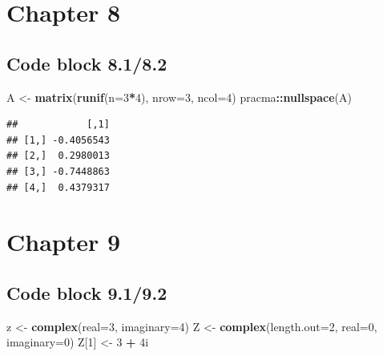 \documentclass[
]{book}
\newenvironment{Shaded}{\begin{snugshade}}{\end{snugshade}}
\newcommand{\DataTypeTok}[1]{\textcolor[rgb]{0.13,0.29,0.53}{#1}}
\newcommand{\DecValTok}[1]{\textcolor[rgb]{0.00,0.00,0.81}{#1}}
\newcommand{\KeywordTok}[1]{\textcolor[rgb]{0.13,0.29,0.53}{\textbf{#1}}}
\newcommand{\NormalTok}[1]{#1}
\newcommand{\OperatorTok}[1]{\textcolor[rgb]{0.81,0.36,0.00}{\textbf{#1}}}
\newcommand{\StringTok}[1]{\textcolor[rgb]{0.31,0.60,0.02}{#1}}
\begin{document}
\hypertarget{chapter-8}{%
\section*{Chapter 8}\label{chapter-8}}

\hypertarget{code-block-8.18.2}{%
\subsection*{Code block 8.1/8.2}\label{code-block-8.18.2}}

\begin{Shaded}
\begin{Highlighting}[]
\NormalTok{A \textless{}{-}}\StringTok{ }\KeywordTok{matrix}\NormalTok{(}\KeywordTok{runif}\NormalTok{(}\DataTypeTok{n=}\DecValTok{3}\OperatorTok{*}\DecValTok{4}\NormalTok{), }\DataTypeTok{nrow=}\DecValTok{3}\NormalTok{, }\DataTypeTok{ncol=}\DecValTok{4}\NormalTok{)}
\NormalTok{pracma}\OperatorTok{::}\KeywordTok{nullspace}\NormalTok{(A)}
\end{Highlighting}
\end{Shaded}

\begin{verbatim}
##            [,1]
## [1,] -0.4056543
## [2,]  0.2980013
## [3,] -0.7448863
## [4,]  0.4379317
\end{verbatim}

\hypertarget{chapter-9}{%
\section*{Chapter 9}\label{chapter-9}}

\hypertarget{code-block-9.19.2}{%
\subsection*{Code block 9.1/9.2}\label{code-block-9.19.2}}

\begin{Shaded}
\begin{Highlighting}[]
\NormalTok{z \textless{}{-}}\StringTok{ }\KeywordTok{complex}\NormalTok{(}\DataTypeTok{real=}\DecValTok{3}\NormalTok{, }\DataTypeTok{imaginary=}\DecValTok{4}\NormalTok{)}
\NormalTok{Z \textless{}{-}}\StringTok{ }\KeywordTok{complex}\NormalTok{(}\DataTypeTok{length.out=}\DecValTok{2}\NormalTok{, }\DataTypeTok{real=}\DecValTok{0}\NormalTok{, }\DataTypeTok{imaginary=}\DecValTok{0}\NormalTok{)}
\NormalTok{Z[}\DecValTok{1}\NormalTok{] \textless{}{-}}\StringTok{ }\DecValTok{3} \OperatorTok{+}\StringTok{ }\NormalTok{4i}
\end{Highlighting}
\end{Shaded}
\end{document}
